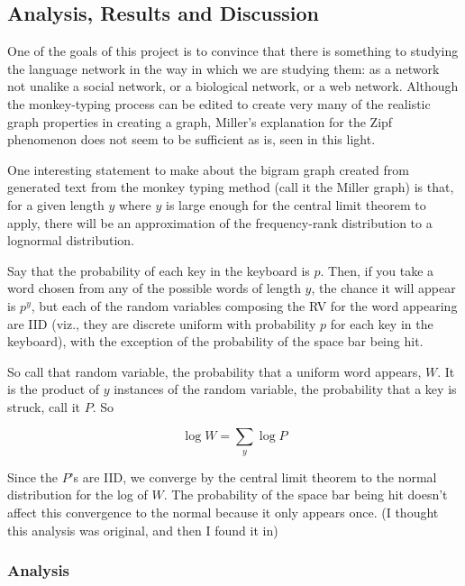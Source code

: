 \documentclass[12pt]{article}
\begin{document}


\subsection*{Analysis, Results and Discussion}

One of the goals of this project is to convince that there is something to studying the language network in the way in which we are studying them: as a network not unalike a social network, or a biological network, or a web network. Although the monkey-typing process can be edited to create very many of the realistic graph properties in creating a graph, Miller's explanation for the Zipf phenomenon does not seem to be sufficient as is, seen in this light.

One interesting statement to make about the bigram graph created from generated text from the monkey typing method (call it the Miller graph) is that, for a given length $y$ where $y$ is large enough for the central limit theorem to apply, there will be an approximation of the frequency-rank distribution to a lognormal distribution.

Say that the probability of each key in the keyboard is $p$. Then, if you take a word chosen from any of the possible words of length $y$, the chance it will appear is $p^y$, but each of the random variables composing the RV for the word appearing are IID (viz., they are discrete uniform with probability $p$ for each key in the keyboard), with the exception of the probability of the space bar being hit.

So call that random variable, the probability that a uniform word appears, $W$. It is the product of $y$ instances of the random variable, the probability that a key is struck, call it $P$. So

$$ \log W = \sum_y \log P $$

Since the $P$'s are IID, we converge by the central limit theorem to the normal distribution for the log of $W$. The probability of the space bar being hit doesn't affect this convergence to the normal because it only appears once. (I thought this analysis was original, and then I found it in) %

\subsubsection*{Analysis}
\end{document}
